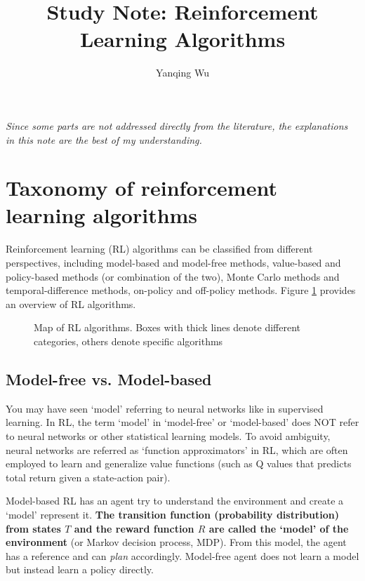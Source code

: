\documentclass[lang=en,mode=normal,device=normal,color=blue,12pt]{elegantnote}
\title{Study Note: Reinforcement Learning Algorithms}
\author{Yanqing Wu\\[0.5cm]{}}
\institute{Viwistar Robotics}
\DeclareMathOperator*{\1}{\mathbbm{1}}
\begin{document}
\maketitle

\newpage
\tableofcontents

\newpage

\textit{Since some parts are not addressed directly from the literature, the explanations in this note are the best of my understanding.}

\newpage
\section{Taxonomy of reinforcement learning algorithms}

Reinforcement learning (RL) algorithms can be classified from different perspectives, including model-based and model-free methods, value-based and policy-based methods (or combination of the two), Monte Carlo methods and temporal-difference methods, on-policy and off-policy methods. Figure \ref{fig:taxonomy} provides an overview of RL algorithms.

\begin{figure}[!ht]
  \centering
  \caption{Map of RL algorithms. Boxes with thick lines denote different categories, others denote specific algorithms \cite{Zhang2020}}
  \label{fig:taxonomy}
\end{figure}

\subsection{Model-free vs. Model-based}
\label{appendix:model-dep}

You may have seen `model' referring to neural networks like in supervised learning.
In RL, the term `model' in `model-free' or `model-based' does NOT refer to neural networks or other statistical learning models.
To avoid ambiguity, neural networks are referred as `function approximators' in RL, which are often employed to learn and generalize value functions (such as Q values that predicts total return given a state-action pair).

Model-based RL has an agent try to understand the environment and create a `model' represent it.
\textbf{The transition function (probability distribution) from states $T$ and the reward function $R$ are called the `model' of the environment} (or Markov decision process, MDP).
From this model, the agent has a reference and can \textit{plan} accordingly. Model-free agent does not learn a model but instead learn a policy directly.
\end{document}
